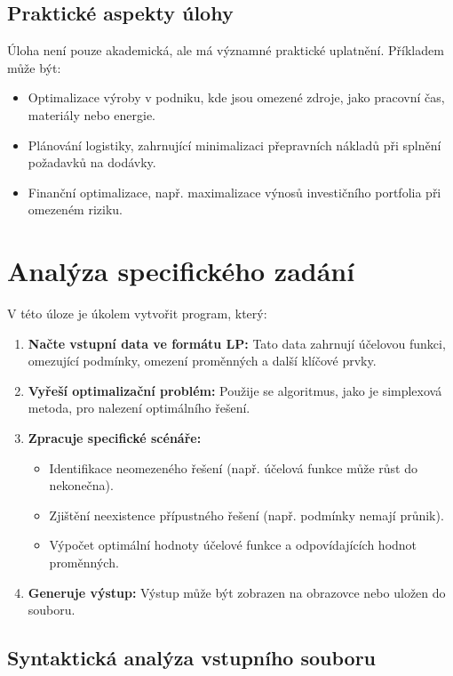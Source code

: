 \documentclass[czech, sem, kiv, he, pdf, viewonly]{fasthesis}
\begin{document}
\subsection{Praktické aspekty úlohy}
Úloha není pouze akademická, ale má významné praktické uplatnění. Příkladem může být:
\begin{itemize}
    \item Optimalizace výroby v podniku, kde jsou omezené zdroje, jako pracovní čas, materiály nebo energie.
    \item Plánování logistiky, zahrnující minimalizaci přepravních nákladů při splnění požadavků na dodávky.
    \item Finanční optimalizace, např. maximalizace výnosů investičního portfolia při omezeném riziku.
\end{itemize}

\section{Analýza specifického zadání}

V této úloze je úkolem vytvořit program, který:
\begin{enumerate}
    \item \textbf{Načte vstupní data ve formátu LP:} Tato data zahrnují účelovou funkci, omezující podmínky, omezení proměnných a další klíčové prvky.
    \item \textbf{Vyřeší optimalizační problém:} Použije se algoritmus, jako je simplexová metoda, pro nalezení optimálního řešení.
    \item \textbf{Zpracuje specifické scénáře:}
    \begin{itemize}
        \item Identifikace neomezeného řešení (např. účelová funkce může růst do nekonečna).
        \item Zjištění neexistence přípustného řešení (např. podmínky nemají průnik).
        \item Výpočet optimální hodnoty účelové funkce a odpovídajících hodnot proměnných.
    \end{itemize}
    \item \textbf{Generuje výstup:} Výstup může být zobrazen na obrazovce nebo uložen do souboru.
\end{enumerate}

\subsection{Syntaktická analýza vstupního souboru}
\end{document}
